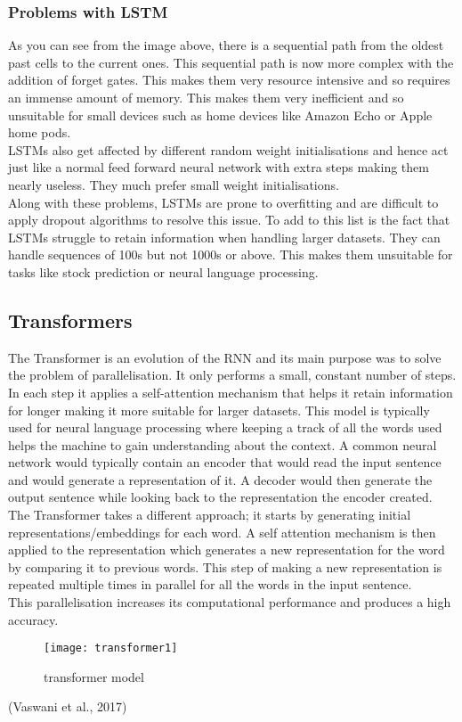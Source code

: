 \documentclass{article}
\begin{document}
\subsubsection{Problems with LSTM}
As you can see from the image above, there is a sequential path from the oldest past cells to the
current ones. This sequential path is now more complex with the addition of forget gates. This
makes them very resource intensive and so requires an immense amount of memory. This makes
them very inefficient and so unsuitable for small devices such as home devices like Amazon
Echo or Apple home pods.\\
LSTMs also get affected by different random weight initialisations and hence act just like a normal
feed forward neural network with extra steps making them nearly useless. They much prefer
small weight initialisations.\\
Along with these problems, LSTMs are prone to overfitting and are difficult to apply dropout
algorithms to resolve this issue. To add to this list is the fact that LSTMs struggle to retain
information when handling larger datasets. They can handle sequences of 100s but not 1000s or above. This makes them unsuitable for tasks like stock prediction or neural language processing.

\subsection{Transformers}
The Transformer is an evolution of the RNN and its main purpose was to solve the problem of
parallelisation. It only performs a small, constant number of steps. In each step it applies a
self-attention mechanism that helps it retain information for longer making it more suitable for
larger datasets. This model is typically used for neural language processing where keeping a
track of all the words used helps the machine to gain understanding about the context. A
common neural network would typically contain an encoder that would read the input sentence
and would generate a representation of it. A decoder would then generate the output sentence
while looking back to the representation the encoder created. The Transformer takes a different
approach; it starts by generating initial representations/embeddings for each word. A self
attention mechanism is then applied to the representation which generates a new representation
for the word by comparing it to previous words. This step of making a new representation is
repeated multiple times in parallel for all the words in the input sentence.\\
This parallelisation increases its computational performance and produces a high accuracy.
\begin{figure}[H]
    \centering
    \texttt{[image: transformer1]}
    \caption{transformer model}
\end{figure}
(Vaswani et al., 2017)
\end{document}

